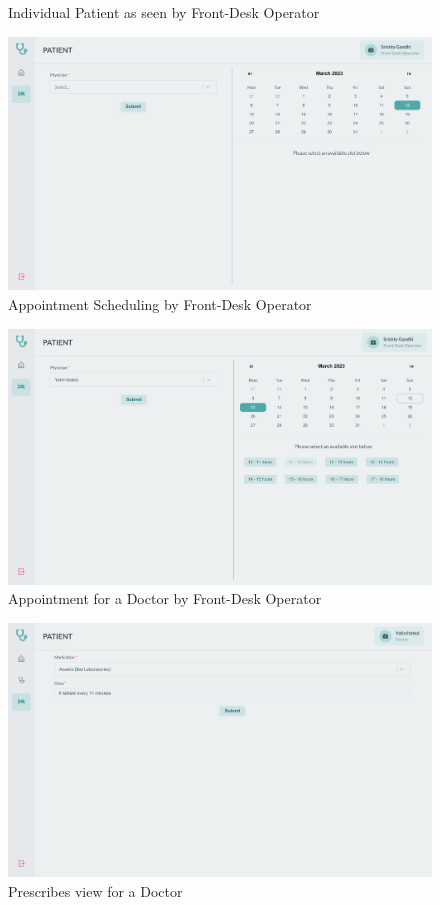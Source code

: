 \documentclass[12pt,a4paper]{article}
\begin{document}
{\begin{enumerate}
\begin{figure}[htp]
    \caption{Individual Patient as seen by Front-Desk Operator}
\end{figure}
\begin{figure}[htp]
    \centering
    \includegraphics[width=1\textwidth]{appointment_sched.png}
    \caption{Appointment Scheduling by Front-Desk Operator}
\end{figure}
\begin{figure}[htp]
    \centering
    \includegraphics[width=1\textwidth]{appointment_for_a_doc.png}
    \caption{Appointment for a Doctor by Front-Desk Operator}
\end{figure}
\begin{figure}[htp]
    \centering
    \includegraphics[width=1\textwidth]{prescribes.png}
    \caption{Prescribes view for a Doctor}
\end{figure}


\end{enumerate}}
\end{document}
